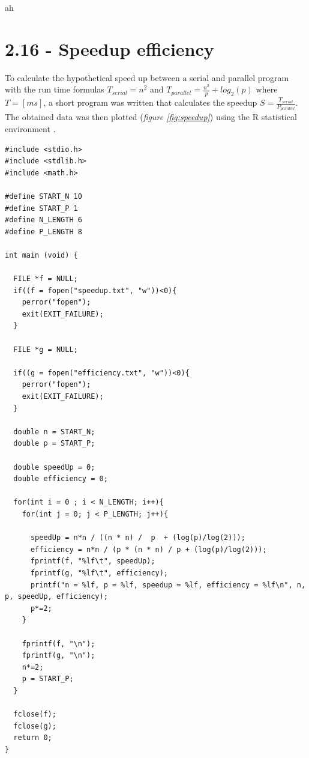 \documentclass[a4paper,11pt,twoside]{article}
\begin{document}
    
ah\section{2.16 - Speedup efficiency}
To calculate the hypothetical speed up between a serial and parallel program with the run time formulas $T_{serial}=n^{2}$ and $T_{parallel} = \frac{n^{2}}{p}+log_{2}(p)$ where $T=[ms]$, a short program was written that calculates the speedup $S=\frac{T_{serial}}{P_{parallel}}$. The obtained data was then plotted (\textit{figure \ref{fig:speedup}}) using the R statistical environment \cite{rlanguage}.

\begin{verbatim}
#include <stdio.h>
#include <stdlib.h>
#include <math.h>

#define START_N 10
#define START_P 1
#define N_LENGTH 6
#define P_LENGTH 8

int main (void) {
  
  FILE *f = NULL;
  if((f = fopen("speedup.txt", "w"))<0){
    perror("fopen");
    exit(EXIT_FAILURE);
  }

  FILE *g = NULL;

  if((g = fopen("efficiency.txt", "w"))<0){
    perror("fopen");
    exit(EXIT_FAILURE);
  }

  double n = START_N;
  double p = START_P;

  double speedUp = 0;
  double efficiency = 0;

  for(int i = 0 ; i < N_LENGTH; i++){
    for(int j = 0; j < P_LENGTH; j++){

      speedUp = n*n / ((n * n) /  p  + (log(p)/log(2)));
      efficiency = n*n / (p * (n * n) / p + (log(p)/log(2))); 
      fprintf(f, "%lf\t", speedUp);
      fprintf(g, "%lf\t", efficiency);
      printf("n = %lf, p = %lf, speedup = %lf, efficiency = %lf\n", n, p, speedUp, efficiency);
      p*=2;
    }

    fprintf(f, "\n");
    fprintf(g, "\n");
    n*=2;
    p = START_P;
  }

  fclose(f);
  fclose(g);
  return 0;
}
\end{verbatim}
\end{document}
